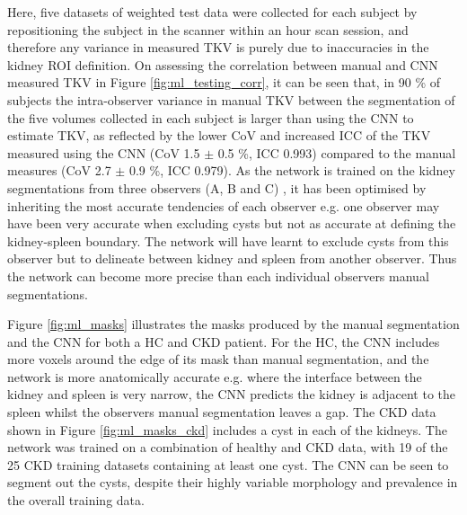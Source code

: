 Here, five datasets of \ttwo weighted test data were collected for each subject by repositioning the subject in the scanner within an hour scan session, and therefore any variance in measured \ac{TKV} is purely due to inaccuracies in the kidney \ac{ROI} definition. On assessing the correlation between manual and \ac{CNN} measured \ac{TKV} in Figure \ref{fig:ml_testing_corr}, it can be seen that, in 90 \% of subjects the intra-observer variance in manual \ac{TKV} between the segmentation of the five volumes collected in each subject is larger than using the \ac{CNN} to estimate \ac{TKV}, as reflected by the lower \ac{CoV} and increased \ac{ICC} of the \ac{TKV} measured using the \ac{CNN} (\ac{CoV} 1.5 $\pm$ 0.5 \%, \ac{ICC} 0.993) compared to the manual measures (\ac{CoV} 2.7 $\pm$ 0.9 \%, ICC 0.979). As the network is trained on the kidney segmentations from three observers (A, B and C) , it has been optimised by inheriting the most accurate tendencies of each observer e.g. one observer may have been very accurate when excluding cysts but not as accurate at defining the kidney-spleen boundary. The network will have learnt to exclude cysts from this observer but to delineate between kidney and spleen from another observer. Thus the network can become more precise than each individual observers manual segmentations. %

Figure \ref{fig:ml_masks} illustrates the masks produced by the manual segmentation and the \ac{CNN} for both a \ac{HC} and \ac{CKD} patient. For the \ac{HC}, the \ac{CNN} includes more voxels around the edge of its mask than manual segmentation, and the network is more anatomically accurate e.g. where the interface between the kidney and spleen is very narrow, the \ac{CNN} predicts the kidney is adjacent to the spleen whilst the observers manual segmentation leaves a gap. The \ac{CKD} data shown in Figure \ref{fig:ml_masks_ckd} includes a cyst in each of the kidneys. The network was trained on a combination of healthy and \ac{CKD} data, with 19 of the 25 \ac{CKD} training datasets containing at least one cyst. The \ac{CNN} can be seen to segment out the cysts, despite their highly variable morphology and prevalence in the overall training data.
 

